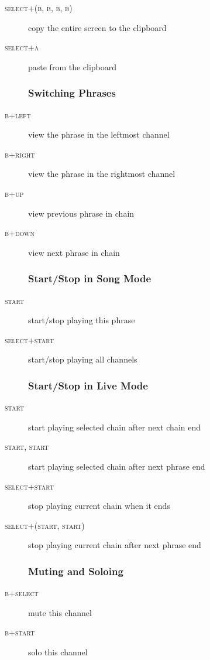 \begin{description}
\item[\textsc{select+(b, b, b, b)}] copy the entire screen to the clipboard
\item[\textsc{select+a}] paste from the clipboard

\subsubsection{Switching Phrases}
\item[\textsc{b+left}] view the phrase in the leftmost channel
\item[\textsc{b+right}] view the phrase in the rightmost channel
\item[\textsc{b+up}] view previous phrase in chain
\item[\textsc{b+down}] view next phrase in chain

\subsubsection{Start/Stop in Song Mode}

\item[\textsc{start}] start/stop playing this phrase
\item[\textsc{select+start}] start/stop playing all channels

\subsubsection{Start/Stop in Live Mode}
\item[\textsc{start}] start playing selected chain after next chain end
\item[\textsc{start, start}] start playing selected chain after next phrase end
\item[\textsc{select+start}] stop playing current chain when it ends
\item[\textsc{select+(start, start)}] stop playing current chain after next phrase end

\subsubsection{Muting and Soloing}
\item[\textsc{b+select}] mute this channel
\item[\textsc{b+start}] solo this channel
\end{description}



